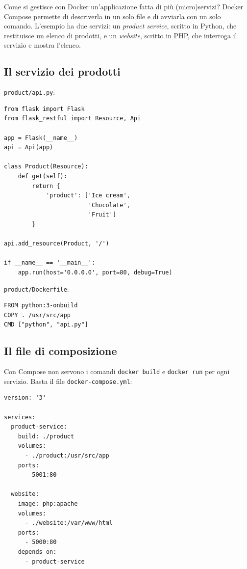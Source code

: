 Come si gestisce con Docker un'applicazione fatta di più (micro)servizi? Docker Compose permette di descriverla in un
solo file e di avviarla con un solo comando. L'esempio ha due servizi: un \emph{product service}, scritto in Python,
che restituisce un elenco di prodotti, e un \emph{website}, scritto in PHP, che interroga il servizio e mostra
l'elenco.

\subsection{Il servizio dei prodotti}

\texttt{product/api.py}:

{\small
\begin{verbatim}
from flask import Flask
from flask_restful import Resource, Api

app = Flask(__name__)
api = Api(app)

class Product(Resource):
    def get(self):
        return {
            'product': ['Ice cream',
                        'Chocolate',
                        'Fruit']
        }

api.add_resource(Product, '/')

if __name__ == '__main__':
    app.run(host='0.0.0.0', port=80, debug=True)
\end{verbatim}
}

\texttt{product/Dockerfile}:

{\small
\begin{verbatim}
FROM python:3-onbuild
COPY . /usr/src/app
CMD ["python", "api.py"]
\end{verbatim}
}

\subsection{Il file di composizione}

Con Compose non servono i comandi \texttt{docker build} e \texttt{docker run} per ogni servizio. Basta il file
\texttt{docker-compose.yml}:

{\small
\begin{verbatim}
version: '3'

services:
  product-service:
    build: ./product
    volumes:
      - ./product:/usr/src/app
    ports:
      - 5001:80

  website:
    image: php:apache
    volumes:
      - ./website:/var/www/html
    ports:
      - 5000:80
    depends_on:
      - product-service
\end{verbatim}
}

